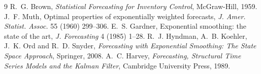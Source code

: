 \documentclass[11pt,a4paper]{article}
\begin{document}
\begin{thebibliography}{9}
 R.~G. Brown, \emph{Statistical Forecasting for Inventory Control}, McGraw-Hill, 1959.
 J.~F. Muth, Optimal properties of exponentially weighted forecasts,
  \emph{J. Amer. Statist. Assoc.} 55 (1960) 299--306.
 E.~S. Gardner, Exponential smoothing: the state of the art,
  \emph{J. Forecasting} 4 (1985) 1--28.
 R.~J. Hyndman, A.~B. Koehler, J.~K. Ord and R.~D. Snyder,
  \emph{Forecasting with Exponential Smoothing: The State Space Approach}, Springer, 2008.
 A.~C. Harvey, \emph{Forecasting, Structural Time Series Models and the Kalman Filter},
  Cambridge University Press, 1989.
\end{thebibliography}
\end{document}

